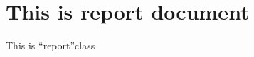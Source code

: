 \documentclass[a4papper, 12pt]{report}
\begin{document}
\chapter{This is report document}
This is \textquotedblleft report\textquotedblright class
\end{document}
